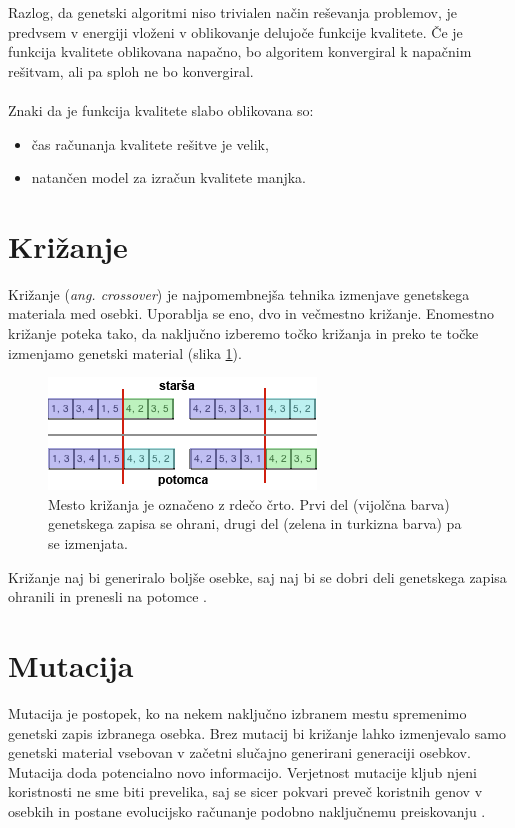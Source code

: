 \documentclass[a4paper, 12pt]{book}
\begin{document}
Razlog, da genetski algoritmi niso trivialen na\v cin re\v sevanja problemov, je predvsem v energiji vlo\v zeni v oblikovanje delujo\v ce funkcije kvalitete. \v Ce je funkcija kvalitete oblikovana napa\v cno, bo algoritem konvergiral k napa\v cnim re\v sitvam, ali pa sploh ne bo konvergiral.\\\\
Znaki da je funkcija kvalitete slabo oblikovana so:
\begin{itemize}
\item \v cas ra\v cunanja kvalitete re\v sitve je velik,
\item natan\v cen model za izra\v cun kvalitete manjka.
\end{itemize}

\section{Kri\v zanje}
\label{seq:krizanje}
Kri\v zanje (\textit{ang. crossover}) je najpomembnej\v sa tehnika izmenjave genetskega materiala med osebki. Uporablja se eno, dvo in ve\v cmestno kri\v zanje. Enomestno kri\v zanje poteka tako, da naklju\v cno izberemo to\v cko kri\v zanja in preko te to\v cke izmenjamo genetski material (slika \ref{krizanje}).
\begin{figure}
\begin{center}
\includegraphics[scale=0.75]{krizanje.png}
\end{center}
\caption{Mesto kri\v zanja je ozna\v ceno z rde\v co \v crto. Prvi del (vijol\v cna barva) genetskega zapisa se ohrani, drugi del (zelena in turkizna barva) pa se izmenjata.}
\label{krizanje}
\end{figure}

Kri\v zanje naj bi generiralo bolj\v se osebke, saj naj bi se dobri deli genetskega zapisa ohranili in prenesli na potomce \cite{inteligentni sistemi}.

\section{Mutacija}
Mutacija je postopek, ko na nekem naklju\v cno izbranem mestu spremenimo genetski zapis izbranega osebka. 
Brez mutacij bi kri\v zanje lahko izmenjevalo samo genetski material vsebovan v za\v cetni slu\v cajno generirani generaciji osebkov. Mutacija doda potencialno novo informacijo. Verjetnost mutacije kljub njeni koristnosti ne sme biti prevelika, saj se sicer pokvari preve\v c koristnih genov v osebkih in postane evolucijsko ra\v cunanje podobno naklju\v cnemu preiskovanju
\cite{inteligentni sistemi}.
\end{document}

